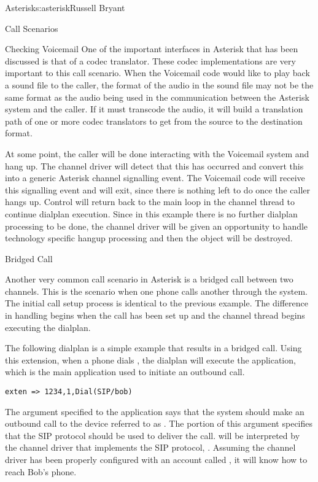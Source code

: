 \begin{aosachapter}{Asterisk}{s:asterisk}{Russell Bryant}
\begin{aosasect1}{Call Scenarios}
\begin{aosasect2}{Checking Voicemail}
One of the important interfaces in Asterisk that has been discussed is
that of a codec translator. These codec implementations are very
important to this call scenario. When the Voicemail code would like to
play back a sound file to the caller, the format of the audio in the
sound file may not be the same format as the audio being used in the
communication between the Asterisk system and the caller. If it must
transcode the audio, it will build a translation path of one or more
codec translators to get from the source to the destination format.


At some point, the caller will be done interacting with the Voicemail
system and hang up. The channel driver will detect that this has
occurred and convert this into a generic Asterisk channel signalling
event. The Voicemail code will receive this signalling event and will
exit, since there is nothing left to do once the caller hangs up.
Control will return back to the main loop in the channel thread to
continue dialplan execution. Since in this example there is no further
dialplan processing to be done, the channel driver will be given an
opportunity to handle technology specific hangup processing and then
the  object will be destroyed.

\end{aosasect2}

\begin{aosasect2}{Bridged Call}

Another very common call scenario in Asterisk is a bridged call
between two channels. This is the scenario when one phone calls
another through the system. The initial call setup process is
identical to the previous example. The difference in handling begins
when the call has been set up and the channel thread begins executing
the dialplan.

The following dialplan is a simple example that results in a bridged
call. Using this extension, when a phone dials , the
dialplan will execute the  application, which is the main
application used to initiate an outbound call.

\begin{verbatim}
exten => 1234,1,Dial(SIP/bob)
\end{verbatim}

\noindent The argument specified to the  application says that the
system should make an outbound call to the device referred to as
. The  portion of this argument specifies that
the SIP protocol should be used to deliver the call.  will
be interpreted by the channel driver that implements the SIP protocol,
.  Assuming the channel driver has been properly
configured with an account called , it will know how to
reach Bob's phone.


\end{aosasect2}
\end{aosasect1}
\end{aosachapter}
